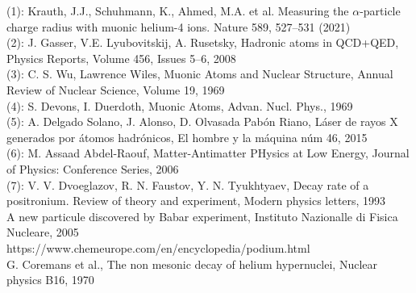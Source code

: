 \documentclass[preview]{standalone}
\begin{document}
\begin{center}
(1): Krauth, J.J., Schuhmann, K., Ahmed, M.A. et al. Measuring the $\alpha$-particle charge radius with muonic helium-4 ions. Nature 589, 527–531 (2021)\\ (2): J. Gasser, V.E. Lyubovitskij, A. Rusetsky, Hadronic atoms in QCD+QED, Physics Reports, Volume 456, Issues 5–6, 2008\\ (3): C. S. Wu, Lawrence Wiles, Muonic Atoms and Nuclear Structure, Annual Review of Nuclear Science, Volume 19, 1969\\ (4): S. Devons, I. Duerdoth, Muonic Atoms, Advan. Nucl. Phys., 1969\\ (5): A. Delgado Solano, J. Alonso, D. Olvasada Pabón Riano, Láser de rayos X generados por átomos hadrónicos, El hombre y la máquina núm 46, 2015\\ (6): M. Assaad Abdel-Raouf, Matter-Antimatter PHysics at Low Energy, Journal of Physics: Conference Series, 2006\\ (7): V. V. Dvoeglazov, R. N. Faustov, Y. N. Tyukhtyaev, Decay rate of a positronium. Review of theory and experiment, Modern physics letters, 1993\\ A new particule discovered by Babar experiment, Instituto Nazionalle di Fisica Nucleare, 2005\\ https://www.chemeurope.com/en/encyclopedia/podium.html\\ G. Coremans et al., The non mesonic decay of helium hypernuclei, Nuclear physics B16, 1970
\end{center}
\end{document}
